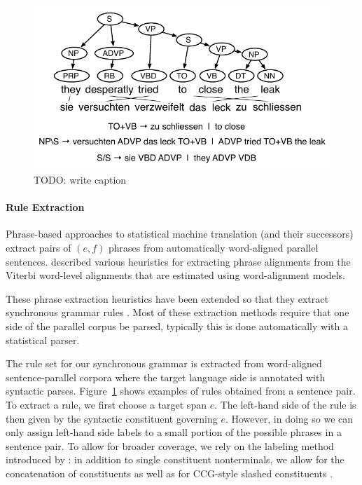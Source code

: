 \documentclass[11pt]{article}
\newcommand{\mnote}[1]{\marginpar{%
  \vskip-\baselineskip
  \raggedright\footnotesize
  \itshape\hrule\smallskip\footnotesize{#1}\par\smallskip\hrule}}
\begin{document}
\begin{figure}[t]
\begin{center}
\includegraphics[width=0.99\linewidth]{figures/example_extraction.pdf}
\end{center}
\caption{TODO: write caption}
\label{example_extraction}
\end{figure}

\paragraph{Rule Extraction}

Phrase-based approaches to statistical machine translation (and their successors) extract pairs of $(e, f)$ phrases from automatically word-aligned parallel sentences. 
described various heuristics for extracting phrase alignments from the Viterbi word-level alignments that are estimated using  word-alignment models.  

These phrase extraction heuristics have been extended so that they extract synchronous grammar rules \cite{Galley2004,Chiang2005,Zollmann2006,Liu2006}.  Most of these extraction methods require that one side of the parallel corpus be parsed, typically this is done automatically with a statistical parser.  

\mnote{ccb - todo - tighten this up.}   
  The rule set
for our synchronous grammar is extracted from word-aligned
sentence-parallel corpora where the target language side is annotated
with syntactic parses. Figure~\ref{example_extraction} shows examples
of rules obtained from a sentence pair. To extract a rule, we first
choose a target span $e$. The left-hand side of the rule is then given
by the syntactic constituent governing $e$. However, in doing so we
can only assign left-hand side labels to a small portion of the
possible phrases in a sentence pair. To allow for broader coverage, we
rely on the labeling method introduced by : in
addition to single constituent nonterminals, we allow for the
concatenation of constituents as well as for CCG-style slashed
constituents \cite{Steedman1999}.
\end{document}
